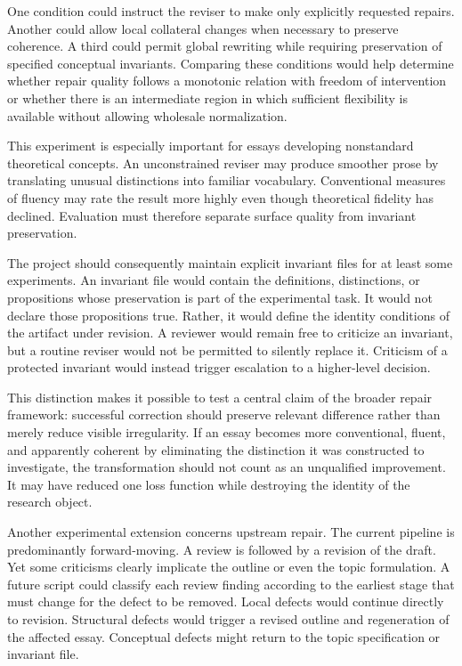 \documentclass[11pt]{article}
\begin{document}
One condition could instruct the reviser to make only explicitly requested repairs. Another could allow local collateral changes when necessary to preserve coherence. A third could permit global rewriting while requiring preservation of specified conceptual invariants. Comparing these conditions would help determine whether repair quality follows a monotonic relation with freedom of intervention or whether there is an intermediate region in which sufficient flexibility is available without allowing wholesale normalization.

This experiment is especially important for essays developing nonstandard theoretical concepts. An unconstrained reviser may produce smoother prose by translating unusual distinctions into familiar vocabulary. Conventional measures of fluency may rate the result more highly even though theoretical fidelity has declined. Evaluation must therefore separate surface quality from invariant preservation.

The project should consequently maintain explicit invariant files for at least some experiments. An invariant file would contain the definitions, distinctions, or propositions whose preservation is part of the experimental task. It would not declare those propositions true. Rather, it would define the identity conditions of the artifact under revision. A reviewer would remain free to criticize an invariant, but a routine reviser would not be permitted to silently replace it. Criticism of a protected invariant would instead trigger escalation to a higher-level decision.

This distinction makes it possible to test a central claim of the broader repair framework: successful correction should preserve relevant difference rather than merely reduce visible irregularity. If an essay becomes more conventional, fluent, and apparently coherent by eliminating the distinction it was constructed to investigate, the transformation should not count as an unqualified improvement. It may have reduced one loss function while destroying the identity of the research object.

Another experimental extension concerns upstream repair. The current pipeline is predominantly forward-moving. A review is followed by a revision of the draft. Yet some criticisms clearly implicate the outline or even the topic formulation. A future script could classify each review finding according to the earliest stage that must change for the defect to be removed. Local defects would continue directly to revision. Structural defects would trigger a revised outline and regeneration of the affected essay. Conceptual defects might return to the topic specification or invariant file.
\end{document}
